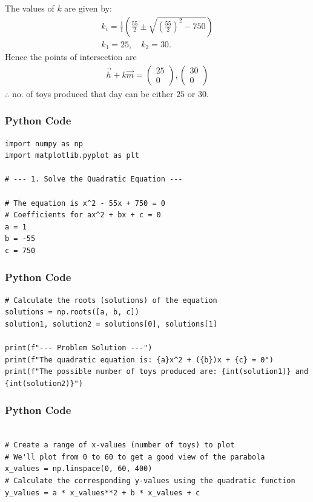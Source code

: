 \documentclass{beamer}
\begin{document}
\begin{frame}
The values of $k$ are given by:
\begin{align}
k_{i} = \frac{1}{1} \left( \frac{55}{2} \pm \sqrt{\left(\frac{55}{2}\right)^2 - 750} \right)\\
k_1 = 25, \quad k_2 = 30.
\end{align}
Hence the points of intersection are
\begin{align}
    \vec{h} + k\vec{m}=\begin{pmatrix} 25 \\ 0 \end{pmatrix},\begin{pmatrix} 30\\ 0 \end{pmatrix}
\end{align}
$\therefore$ no. of toys produced that day can be either $25$ or $30$.
\end{frame}


\begin{frame}[fragile]
\frametitle{Python Code}
\begin{lstlisting}
import numpy as np
import matplotlib.pyplot as plt

# --- 1. Solve the Quadratic Equation ---

# The equation is x^2 - 55x + 750 = 0
# Coefficients for ax^2 + bx + c = 0
a = 1
b = -55
c = 750
\end{lstlisting}
\end{frame}

\begin{frame}[fragile]
\frametitle{Python Code}
\begin{lstlisting}
# Calculate the roots (solutions) of the equation
solutions = np.roots([a, b, c])
solution1, solution2 = solutions[0], solutions[1]

print(f"--- Problem Solution ---")
print(f"The quadratic equation is: {a}x^2 + ({b})x + {c} = 0")
print(f"The possible number of toys produced are: {int(solution1)} and {int(solution2)}")
\end{lstlisting}
\end{frame}

\begin{frame}[fragile]
\frametitle{Python Code}
\begin{lstlisting}

# Create a range of x-values (number of toys) to plot
# We'll plot from 0 to 60 to get a good view of the parabola
x_values = np.linspace(0, 60, 400)
# Calculate the corresponding y-values using the quadratic function
y_values = a * x_values**2 + b * x_values + c
\end{lstlisting}
\end{frame}
\end{document}
